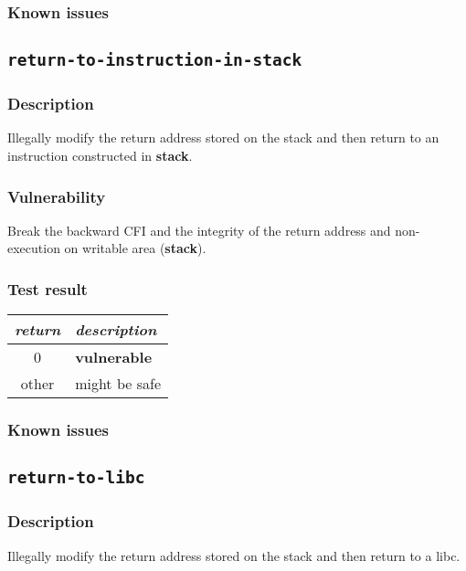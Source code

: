 \documentclass[a4paper]{book}
\begin{document}
\subsubsection{Known issues}

\newpage
\subsection{\texttt{return-to-instruction-in-stack}}\label{test-return-to-instruction-in-stack}

\subsubsection{Description}
Illegally modify the return address stored on the stack and then return to  an instruction constructed in \textbf{stack}.

\subsubsection{Vulnerability}
Break the backward CFI and the integrity of the return address and non-execution on writable area (\textbf{stack}).

\subsubsection{Test result}
\begin{tabular}{cl}
  \toprule
  \emph{return}  & \emph{description} \\
  \midrule
  0              & \textbf{vulnerable} \\
  other          & might be safe \\
  \bottomrule
\end{tabular}
  
\subsubsection{Known issues}
\newpage
\subsection{\texttt{return-to-libc}}\label{test-return-to-libc}

\subsubsection{Description}
Illegally modify the return address stored on the stack and then return to a libc.
\end{document}

